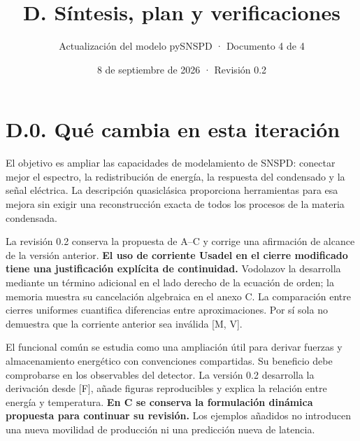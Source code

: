 \documentclass[
  spanish,
  10pt,
  a4paper,
]{article}
\title{D. Síntesis, plan y verificaciones}
\subtitle{Actualización del modelo pySNSPD · Documento 4 de 4}
\author{}
\date{8 de septiembre de 2026 · Revisión 0.2}
\begin{document}
\maketitle

{
\setcounter{tocdepth}{2}
\tableofcontents
}
\newpage

\section{D.0. Qué cambia en esta
iteración}\label{d.0.-quuxe9-cambia-en-esta-iteraciuxf3n}

El objetivo es ampliar las capacidades de modelamiento de SNSPD:
conectar mejor el espectro, la redistribución de energía, la respuesta
del condensado y la señal eléctrica. La descripción quasiclásica
proporciona herramientas para esa mejora sin exigir una reconstrucción
exacta de todos los procesos de la materia condensada.

La revisión 0.2 conserva la propuesta de A--C y corrige una afirmación
de alcance de la versión anterior. \textbf{El uso de corriente Usadel en
el cierre modificado tiene una justificación explícita de continuidad.}
Vodolazov la desarrolla mediante un término adicional en el lado derecho
de la ecuación de orden; la memoria muestra su cancelación algebraica en
el anexo C. La comparación entre cierres uniformes cuantifica
diferencias entre aproximaciones. Por sí sola no demuestra que la
corriente anterior sea inválida {[}M, V{]}.

El funcional común se estudia como una ampliación útil para derivar
fuerzas y almacenamiento energético con convenciones compartidas. Su
beneficio debe comprobarse en los observables del detector. La versión
0.2 desarrolla la derivación desde {[}F{]}, añade figuras reproducibles
y explica la relación entre energía y temperatura. \textbf{En C se
conserva la formulación dinámica propuesta para continuar su revisión.}
Los ejemplos añadidos no introducen una nueva movilidad de producción ni
una predicción nueva de latencia.
\end{document}
